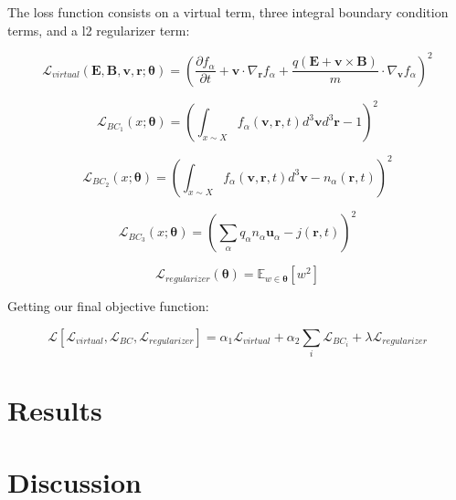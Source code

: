 \documentclass[12pt]{article}
\begin{document}
The loss function consists on a virtual term, three integral boundary condition terms, and a l2 regularizer term:

\begin{equation}
    \mathcal{L}_{virtual}\left(\mathbf{E}, \mathbf{B}, \mathbf{v}, \mathbf{r}; \mathbf{\theta}\right) = \left(\frac{\partial f_{\alpha}}{\partial t} + \mathbf{v} \cdot \nabla_{\mathbf{r}}  f_{\alpha} + \frac{q (\mathbf{E} + \mathbf{v} \times \mathbf{B})}{m} \cdot \nabla_{\mathbf{v}} f_\alpha \right)^2
\end{equation}

\begin{equation}
    \mathcal{L}_{BC_1} \left(x; \mathbf{\theta}\right) = \left(\int_{x \sim X} f_\alpha (\mathbf{v}, \mathbf{r}, t) d^3\mathbf{v} d^3\mathbf{r} - 1\right)^2
\end{equation}

\begin{equation}
    \mathcal{L}_{BC_2} \left(x; \mathbf{\theta}\right) = \left(\int_{x \sim X} f_\alpha (\mathbf{v}, \mathbf{r}, t) d^3\mathbf{v} - n_\alpha(\mathbf{r}, t) \right)^2
\end{equation}

\begin{equation}
    \mathcal{L}_{BC_3} \left(x; \mathbf{\theta}\right) = \left(\sum_{\alpha} q_\alpha n_\alpha  \mathbf{u}_\alpha- j(\mathbf{r}, t) \right)^2
\end{equation}

\begin{equation}
    \mathcal{L}_{regularizer} \left( \mathbf{\theta} \right) = \mathbb{E}_{w \in \mathbf{\theta}}\left[ w ^ 2 \right]
\end{equation}

Getting our final objective function:

\begin{equation}
    \mathcal{L}\left[\mathcal{L}_{virtual}, \mathcal{L}_{BC}, \mathcal{L}_{regularizer}\right] = \alpha_1 \mathcal{L}_{virtual} + \alpha_2 \sum_{i} \mathcal{L}_{BC_i} + \lambda \mathcal{L}_{regularizer}
\end{equation}

\section{Results}

\section{Discussion}
\end{document}
